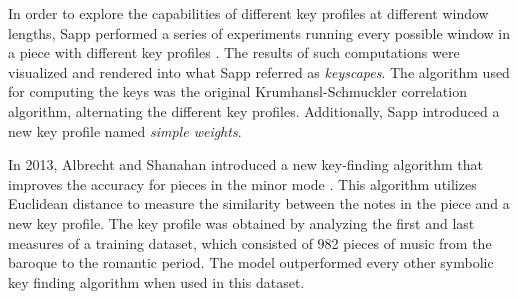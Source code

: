 




In order to explore the capabilities of different key profiles at different window lengths, Sapp performed a series of experiments running every possible window in a piece with different key profiles \cite{sapp2011computational}. The results of such computations were visualized and rendered into what Sapp referred as \emph{keyscapes}. The algorithm used for computing the keys was the original Krumhansl-Schmuckler correlation algorithm, alternating the different key profiles. Additionally, Sapp introduced a new key profile named \emph{simple weights}. 

In 2013, Albrecht and Shanahan introduced a new key-finding algorithm that improves the accuracy for pieces in the minor mode \cite{albrecht2013use}. This algorithm utilizes Euclidean distance to measure the similarity between the notes in the piece and a new key profile. The key profile was obtained by analyzing the first and last measures of a training dataset, which consisted of 982 pieces of music from the baroque to the romantic period. The model outperformed every other symbolic key finding algorithm when used in this dataset.

